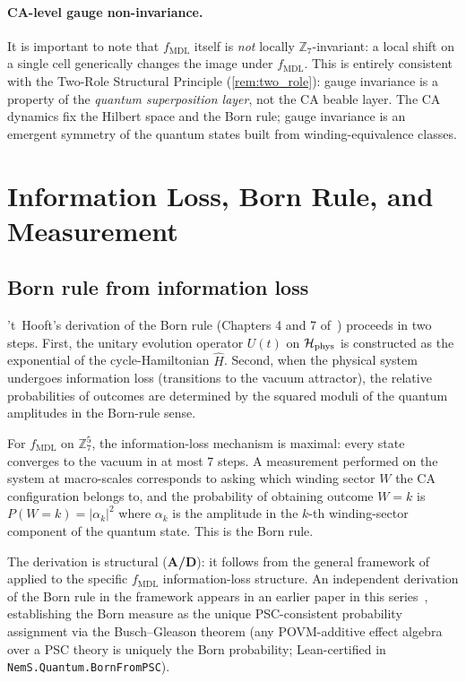 \documentclass[11pt]{article}
\theoremstyle{remark}
\newcommand{\UGP}{\text{UGP}}
\newcommand{\MDL}{\text{MDL}}
\newcommand{\CatAD}{\textbf{A/D}}
\newcommand{\Hil}{\mathcal{H}}
\newcommand{\Ham}{\hat{H}}
\begin{document}
\paragraph{CA-level gauge non-invariance.}
It is important to note that $f_{\MDL}$ itself is \emph{not} locally
$\mathbb{Z}_7$-invariant: a local shift on a single cell generically
changes the image under $f_{\MDL}$.
This is entirely consistent with the Two-Role Structural Principle (\cref{rem:two_role}):
gauge invariance is a property of the \emph{quantum superposition layer},
not the CA beable layer.
The CA dynamics fix the Hilbert space and the Born rule; gauge
invariance is an emergent symmetry of the quantum states built from
winding-equivalence classes.

\section{Information Loss, Born Rule, and Measurement}
\label{sec:born}

\subsection{Born rule from information loss}
\label{ssec:born_derivation}

't~Hooft's derivation of the Born rule (Chapters 4 and 7
of~\cite{tHooft2016CA}) proceeds in two steps.
First, the unitary evolution operator $U(t)$ on $\Hil_{\rm phys}$ is
constructed as the exponential of the cycle-Hamiltonian $\Ham$.
Second, when the physical system undergoes information loss (transitions
to the vacuum attractor), the relative probabilities of outcomes
are determined by the squared moduli of the quantum amplitudes in the
Born-rule sense.

For $f_{\MDL}$ on $\mathbb{Z}_7^5$, the information-loss mechanism is
maximal: every state converges to the vacuum in at most 7 steps.
A measurement performed on the system at macro-scales corresponds to
asking which winding sector $W$ the CA configuration belongs to, and
the probability of obtaining outcome $W=k$ is
$P(W=k) = |\alpha_k|^2$ where $\alpha_k$ is the amplitude in the
$k$-th winding-sector component of the quantum state.
This is the Born rule.

The derivation is structural (\CatAD{}): it follows from the general
framework of~\cite{tHooft2016CA} applied to the specific $f_{\MDL}$
information-loss structure.
An independent derivation of the Born rule in the \UGP{} framework
appears in an earlier paper in this series~\cite{SpivackBornRule}, establishing
the Born measure as the unique PSC-consistent probability assignment via the
Busch--Gleason theorem (any POVM-additive effect algebra over a PSC theory is
uniquely the Born probability; Lean-certified in \texttt{NemS.Quantum.BornFromPSC}).
\end{document}
